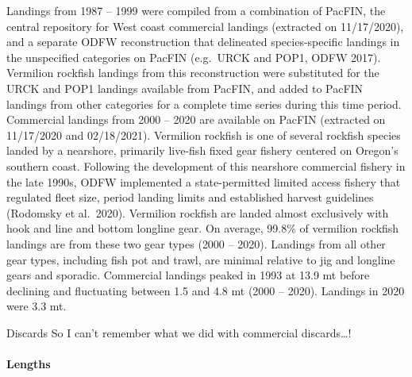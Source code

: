 \documentclass[11pt,
  english,
  a4paper,
]{article}
\begin{document}
\leavevmode\tagmcend\tagstructend\par


Landings from 1987 -- 1999 were compiled from a combination of PacFIN, the central repository for West coast commercial landings (extracted on 11/17/2020), and a separate ODFW reconstruction that delineated species-specific landings in the unspecified categories on PacFIN (e.g.~URCK and POP1, ODFW 2017). Vermilion rockfish landings from this reconstruction were substituted for the URCK and POP1 landings available from PacFIN, and added to PacFIN landings from other categories for a complete time series during this time period. Commercial landings from 2000 -- 2020 are available on PacFIN (extracted on 11/17/2020 and 02/18/2021). Vermilion rockfish is one of several rockfish species landed by a nearshore, primarily live-fish fixed gear fishery centered on Oregon's southern coast. Following the development of this nearshore commercial fishery in the late 1990s, ODFW implemented a state-permitted limited access fishery that regulated fleet size, period landing limits and established harvest guidelines (Rodomsky et al.~2020). Vermilion rockfish are landed almost exclusively with hook and line and bottom longline gear. On average, 99.8\% of vermilion rockfish landings are from these two gear types (2000 -- 2020). Landings from all other gear types, including fish pot and trawl, are minimal relative to jig and longline gears and sporadic. Commercial landings peaked in 1993 at 13.9 mt before declining and fluctuating between 1.5 and 4.8 mt (2000 -- 2020). Landings in 2020 were 3.3 mt.

\leavevmode\tagmcend\tagstructend\par


Discards So I can't remember what we did with commercial discards\ldots!

\leavevmode\tagmcend\tagstructend\par


\hypertarget{lengths}{%
\paragraph{Lengths}\label{lengths}}

\leavevmode\tagmcend\tagstructend

\end{document}
